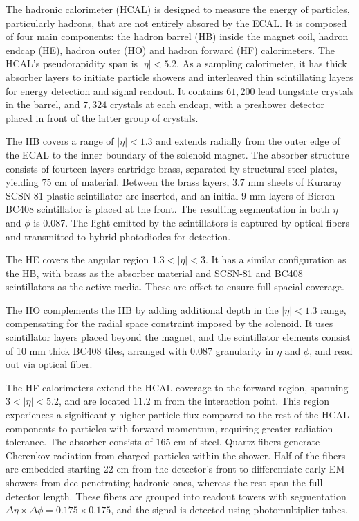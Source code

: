 The hadronic calorimeter (HCAL) is designed to measure the energy of particles, particularly hadrons, that are not entirely absored by the ECAL. It is composed of four main components: the hadron barrel (HB) inside the magnet coil, hadron endcap (HE), hadron outer (HO) and hadron forward (HF) calorimeters. The HCAL's pseudorapidity span is $|\eta| <5.2$. As a sampling calorimeter, it has thick absorber layers to initiate particle showers and interleaved thin scintillating layers for energy detection and signal readout. It contains $61,200$ lead tungstate crystals in the barrel, and $7,324$ crystals at each endcap, with a preshower detector placed in front of the latter group of crystals.

The HB covers a range of $|\eta| <1.3$ and extends radially from the outer edge of the ECAL to the inner boundary of the solenoid magnet. The absorber structure consists of fourteen layers cartridge brass, separated by structural steel plates, yielding $75 \text{ cm}$ of material. Between the brass layers, $3.7 \text{ mm}$ sheets of Kuraray SCSN-81 plastic scintillator are inserted, and an initial $9 \text{ mm}$ layers of Bicron BC408 scintillator is placed at the front. The resulting segmentation in both $\eta$ and $\phi$ is 0.087. The light emitted by the scintillators is captured by optical fibers and transmitted to hybrid photodiodes for detection.

The HE covers the angular region $1.3 <|\eta| < 3$. It has a similar configuration as the HB, with brass as the absorber material and SCSN-81 and BC408 scintillators as the active media. These are offset to ensure full spacial coverage.

The HO complements the HB by adding additional depth in the $|\eta| <1.3$ range, compensating for the radial space constraint imposed by the solenoid. It uses scintillator layers placed beyond the magnet, and the scintillator elements consist of 10 mm thick BC408 tiles, arranged with 0.087 granularity in $\eta$ and $\phi$, and read out via optical fiber.

The HF calorimeters extend the HCAL coverage to the forward region, spanning $3 <|\eta|<5.2$, and are located $11.2 \text{ m}$ from the interaction point. This region experiences a significantly higher particle flux compared to the rest of the HCAL components to particles with forward momentum, requiring greater radiation tolerance. The absorber consists of $165 \text{ cm}$ of steel. Quartz fibers generate Cherenkov radiation from charged particles within the shower. Half of the fibers are embedded starting $22 \text{ cm}$ from the detector's front to differentiate early EM showers from dee-penetrating hadronic ones, whereas the rest span the full detector length. These fibers are grouped into readout towers with segmentation $\Delta \eta \times \Delta \phi = 0.175\times0.175$, and the signal is detected using photomultiplier tubes.

